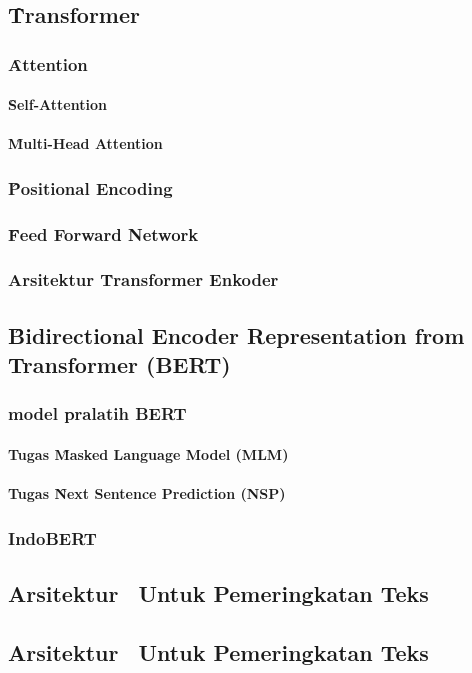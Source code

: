 \chapter{\babTiga}
\label{bab:3}



\noindent{}

\section{\f{Transformer}}
\subsection{\f{Attention}}
\subsubsection{\f{Self-Attention}}
\subsubsection{\f{Multi-Head Attention}}
\subsection{\f{Positional Encoding}}
\subsection{\f{Feed Forward Network}}
\subsection{Arsitektur \f{Transformer} Enkoder}

\section{\f{Bidirectional Encoder Representation from Transformer (BERT)}}
\subsection{model pralatih BERT}
\subsubsection{Tugas \f{Masked Language Model (MLM)}}
\subsubsection{Tugas \f{Next Sentence Prediction (NSP)}}
\subsection{IndoBERT}
\section{Arsitektur \bertcat~Untuk Pemeringkatan Teks}
\section{Arsitektur \bertdot~Untuk Pemeringkatan Teks}




